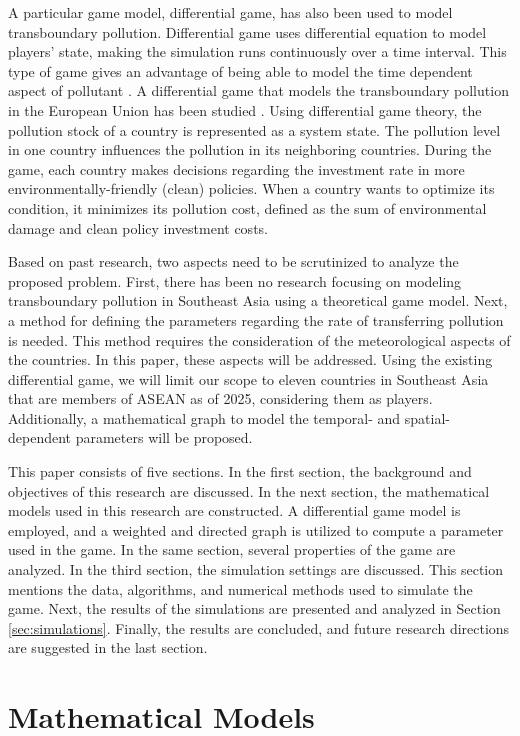 \documentclass[a4paper,fleqn]{cas-dc}
\begin{document}
A particular game model, differential game, has also been used to model transboundary pollution. Differential game uses differential equation to model players' state, making the simulation runs continuously over a time interval. This type of game gives an advantage of being able to model the time dependent aspect of pollutant \citep{missfeldt1999game}. A differential game that models the transboundary pollution in the European Union has been studied \citep{Schuller}. Using differential game theory, the pollution stock of a country is represented as a system state. The pollution level in one country influences the pollution in its neighboring countries. During the game, each country makes decisions regarding the investment rate in more environmentally-friendly (clean) policies. When a country wants to optimize its condition, it minimizes its pollution cost, defined as the sum of environmental damage and clean policy investment costs.

Based on past research, two aspects need to be scrutinized to analyze the proposed problem. First, there has been no research focusing on modeling transboundary pollution in Southeast Asia using a theoretical game model. Next, a method for defining the parameters regarding the rate of transferring pollution is needed. This method requires the consideration of the meteorological aspects of the countries. In this paper, these aspects will be addressed. Using the existing differential game, we will limit our scope to eleven countries in Southeast Asia that are members of ASEAN as of 2025, considering them as players. Additionally, a mathematical graph to model the temporal- and spatial-dependent parameters will be proposed.

This paper consists of five sections. In the first section, the background and objectives of this research are discussed. In the next section, the mathematical models used in this research are constructed. A differential game model is employed, and a weighted and directed graph is utilized to compute a parameter used in the game. In the same section, several properties of the game are analyzed. In the third section, the simulation settings are discussed. This section mentions the data, algorithms, and numerical methods used to simulate the game. Next, the results of the simulations are presented and analyzed in Section \ref{sec:simulations}. Finally, the results are concluded, and future research directions are suggested in the last section.

\section{Mathematical Models} \label{sec:mathematical models}
\end{document}
